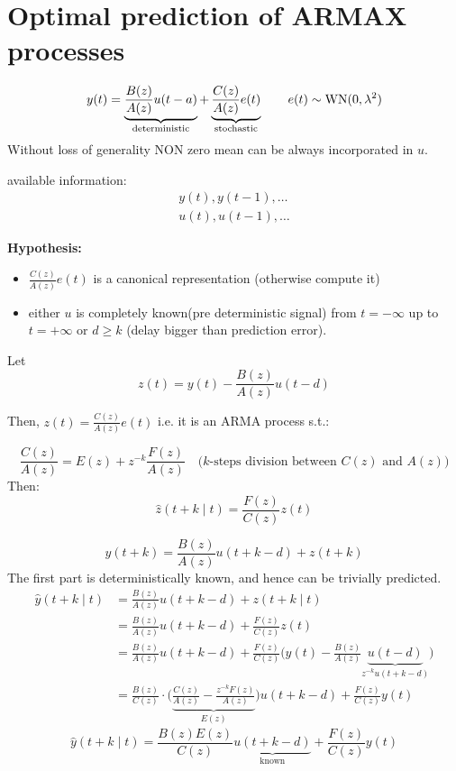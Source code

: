 \section{Optimal prediction of ARMAX processes}

\[
	y(t)=\underbrace{\frac{B(z)}{A(z)} u(t-a)}_{\text{deterministic}}+
	\underbrace{\frac{C(z)}{A(z)} e(t)}_{\text{stochastic}}\qquad e(t)\sim \operatorname{WN}(0,\lambda^2 )
\]
Without loss of generality NON zero mean can be always incorporated in $u$.

available information:
\begin{gather*}
	y(t),y(t-1),\ldots \\
	u(t),u(t-1),\ldots
\end{gather*}

\textbf{Hypothesis:}
\begin{itemize}
	\item $\frac{C(z)}{A(z)}e(t)$  is a canonical representation (otherwise compute it)
	\item either $u$ is completely known(pre deterministic signal) from $t=-\infty$ up to $t=+\infty$ or $d\geq k$ (delay bigger than prediction error).
\end{itemize}

Let 
$$
	z(t)=y(t)-\frac{B(z)}{A(z)} u(t-d)
$$

Then, $z(t)=\frac{C(z)}{A(z)} e(t)$ i.e. it is an ARMA process s.t.:

$$
	\frac{C(z)}{A(z)}=E(z)+z^{-k} \frac{F(z)}{A(z)} \quad\text{($k$-steps division between $C(z)$ and $A(z)$)}
$$
Then:
$$
	\hat{z}(t+k \mid t)=\frac{F(z)}{C(z)} z(t)
$$

$$
	y(t+k)=\frac{B(z)}{A(z)} u(t+k-d)+z(t+k)
$$
The first part is deterministically known, and hence can be trivially predicted.
\begin{align*}
	\hat{y}(t+k \mid t)&=\frac{B(z)}{A(z)} u(t+k-d)+z(t+k \mid t) \\
	&=\frac{B(z)}{A(z)} u(t+k-d)+\frac{F(z)}{C(z)} z(t) \\
	& =\frac{B(z)}{A(z)} u(t+k-d)+\frac{F(z)}{C(z)}\Bigg(y(t)-\frac{B(z)}{A(z)} \underbrace{u(t-d)}_{z^{-k}u(t+k-d)}\Bigg) \\
	&=\frac{B(z)}{C(z)} \cdot\Bigg(\underbrace{\frac{C(z)}{A(z)}-\frac{z^{-k} F(z)}{A(z)}}_{E(z)}\Bigg) u(t+k-d)+\frac{F(z)}{C(z)} y(t)
\end{align*}
$$
	\boxed{\hat{y}(t+k \mid t) =\frac{B(z) E(z)}{C(z)} \underbrace{u(t+k-d)}_{\text{known}}+\frac{F(z)}{C(z)} y(t)}
$$

